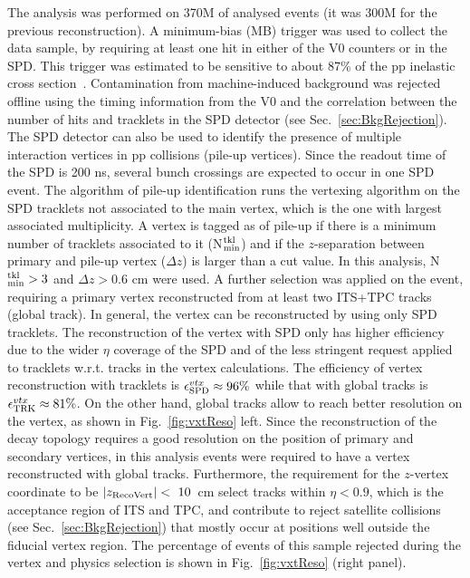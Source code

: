 The analysis was performed on 370M of analysed events (it was 300M for the previous
reconstruction).
 A minimum-bias (MB)
trigger was used to collect the data sample, by requiring
at least one hit in either of the V0 counters or in the SPD.
This trigger was estimated to be sensitive to about 87\% of the pp inelastic
cross section~\cite{Gagliardi:2011he}. 
 Contamination from machine-induced background was rejected 
 offline using the timing information from the V0 and the correlation 
 between the number of hits and tracklets in the SPD
detector (see Sec.~\ref{sec:BkgRejection}).
 The SPD detector can also be used to identify the presence of multiple interaction
vertices in pp collisions (pile-up vertices). Since the readout time of the SPD is
200 ns, several bunch crossings are expected to occur in one SPD event.
The algorithm of pile-up identification runs the vertexing algorithm 
on the SPD tracklets not associated to the
main vertex, which is the one with largest associated multiplicity. 
A vertex is tagged as of pile-up if there is a minimum number of 
tracklets associated to it (N$^{\rm tkl}_{\rm min}$) and if the 
$z$-separation between primary and pile-up vertex ($\Delta z$) is larger than a cut value.
In this analysis, N$^{\rm tkl}_{\rm min}>3$ and $\Delta z>0.6$ cm were used.
A further selection was applied on the event, requiring a primary vertex 
reconstructed from at least two ITS+TPC tracks (global track). In general, the vertex can be reconstructed by
using only SPD tracklets. The reconstruction of the vertex 
with SPD only has higher efficiency due to the wider $\eta$
coverage of the SPD and of the less stringent request applied to tracklets w.r.t. tracks in
the vertex calculations. The efficiency of vertex reconstruction with 
tracklets is $\epsilon^{vtx}_{\rm SPD} \approx 96\%$ while that with global tracks
is $\epsilon^{vtx}_{\rm TRK} \approx 81\%$. On the other hand, global tracks
allow to reach better resolution on the vertex, as shown in Fig.~\ref{fig:vxtReso} left.
Since the reconstruction of the decay topology 
requires a good resolution on the position of primary and secondary vertices,
in this analysis events were required to have a vertex reconstructed with global tracks.
Furthermore, the requirement for the $z$-vertex coordinate to be $|z_{\rm RecoVert}|<~10$~cm 
select tracks within $\eta < 0.9$, which is the acceptance region of ITS and TPC,
and contribute to reject satellite collisions (see Sec.~\ref{sec:BkgRejection}) 
that mostly occur at positions well outside the fiducial vertex region. 
The percentage of events of this sample rejected during the vertex and physics selection
is shown in Fig.~\ref{fig:vxtReso} (right panel). 


